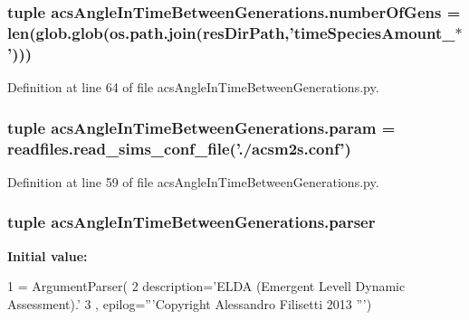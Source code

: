 \hypertarget{a00090_a2dc25dc1c0af14713786b9004cd602f7}{
\subsubsection[{number\-Of\-Gens}]{\setlength{\rightskip}{0pt plus 5cm}tuple acs\-Angle\-In\-Time\-Between\-Generations.\-number\-Of\-Gens = len(glob.\-glob(os.\-path.\-join({\bf res\-Dir\-Path},'time\-Species\-Amount\-\_\-$\ast$')))}}\label{a00090_a2dc25dc1c0af14713786b9004cd602f7}


Definition at line 64 of file acs\-Angle\-In\-Time\-Between\-Generations.\-py.

\hypertarget{a00090_ac26097b5b5657fa4d6bb0d226ffca9da}{
\subsubsection[{param}]{\setlength{\rightskip}{0pt plus 5cm}tuple acs\-Angle\-In\-Time\-Between\-Generations.\-param = readfiles.\-read\-\_\-sims\-\_\-conf\-\_\-file('./acsm2s.\-conf')}}\label{a00090_ac26097b5b5657fa4d6bb0d226ffca9da}


Definition at line 59 of file acs\-Angle\-In\-Time\-Between\-Generations.\-py.

\hypertarget{a00090_af06690b151a135aaff10825277c4345e}{
\subsubsection[{parser}]{\setlength{\rightskip}{0pt plus 5cm}tuple acs\-Angle\-In\-Time\-Between\-Generations.\-parser}}\label{a00090_af06690b151a135aaff10825277c4345e}
{\bfseries Initial value\-:}
\begin{DoxyCode}
1 = ArgumentParser(
2                                 description=\textcolor{stringliteral}{'ELDA (Emergent Levell Dynamic       Assessment).'}
3                                 , epilog=\textcolor{stringliteral}{'''Copyright Alessandro Filisetti 2013 '''})
\end{DoxyCode}


